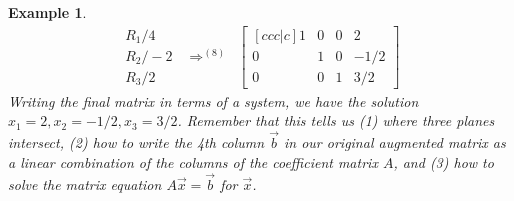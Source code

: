 \documentclass[letterpaper,oneside]{book}%
\theoremstyle{plain}
\theoremstyle{box}
\newtheorem{example}[theorem]{Example}
\theoremstyle{problem}
\newcommand{\R}{\mathbb{R}}
\begin{document}
\begin{example}
$$\begin{array}{rlcl}
\begin{array}{lr} R_1/4\\R_2/-2\\R_3/2 \end{array}
&\Rightarrow^{(8)}&  
\begin{bmatrix}[ccc|c] 1&0&0&2\\0&1&0&-1/2\\0&0&1&3/2\end{bmatrix} 
\end{array}
$$
Writing the final matrix in terms of a system, we have the solution {$x_1=2, x_2=-1/2, x_3=3/2$}. Remember that this tells us (1) where three planes intersect, (2) how to write the 4th column $\vec b$ in our original augmented matrix as a linear combination of the columns of the coefficient matrix $A$, and (3) how to solve the matrix equation $A\vec x = \vec b$ for $\vec x$.
\end{example}
\end{document}
